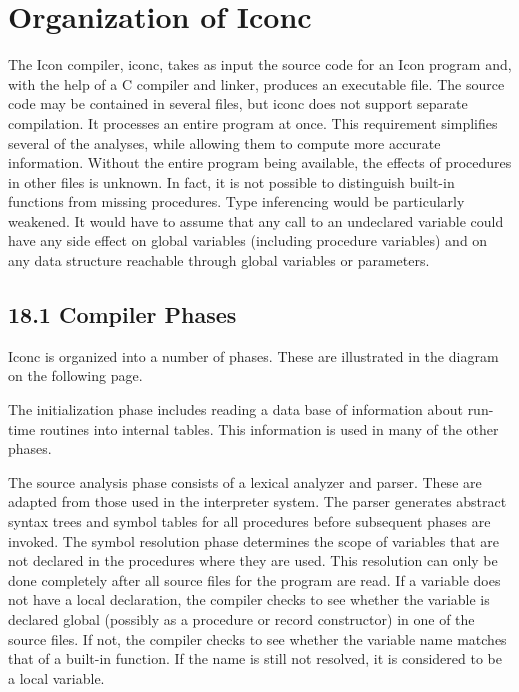 \chapter{Organization of Iconc}

The Icon compiler, iconc, takes as input the source code for an Icon
program and, with the help of a C compiler and linker, produces an
executable file. The source code may be contained in several files,
but iconc does not support separate compilation. It processes an
entire program at once. This requirement simplifies several of the
analyses, while allowing them to compute more accurate
information. Without the entire program being available, the effects
of procedures in other files is unknown. In fact, it is not possible
to distinguish built-in functions from missing procedures. Type
inferencing would be particularly weakened. It would have to assume
that any call to an undeclared variable could have any side effect on
global variables (including procedure variables) and on any data
structure reachable through global variables or parameters.


\section[18.1 Compiler Phases]{18.1 Compiler Phases}

Iconc is organized into a number of phases. These are illustrated in
the diagram on the following page.

The initialization phase includes reading a data base of information
about run-time routines into internal tables. This information is used
in many of the other phases.

The source analysis phase consists of a lexical analyzer and
parser. These are adapted from those used in the interpreter
system. The parser generates abstract syntax trees and symbol tables
for all procedures before subsequent phases are invoked. The symbol
resolution phase determines the scope of variables that are not
declared in the procedures where they are used. This resolution can
only be done completely after all source files for the program are
read. If a variable does not have a local declaration, the compiler
checks to see whether the variable is declared global (possibly as a
procedure or record constructor) in one of the source files. If not,
the compiler checks to see whether the variable name matches that of a
built-in function. If the name is still not resolved, it is considered
to be a local variable.


